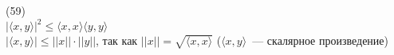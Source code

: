 (59)\\
$|\langle x, y \rangle|^2 \le \langle x, x\rangle\langle y, y\rangle$\\
$|\langle x, y \rangle| \le ||x||\cdot||y||$, так как $||x|| = \sqrt{\langle x, x\rangle}$ ($\langle x, y\rangle$~--- скалярное произведение)